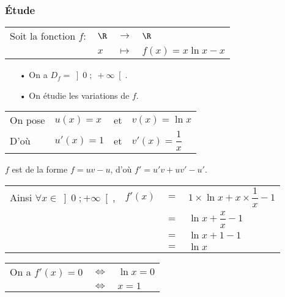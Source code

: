 \newpage

\vspace*{-.8cm}

\subsubsection{Étude }

\begin{tabular}{llll}
Soit la fonction  $f :$ & $\R$ & $\longrightarrow$ & $\R$ \\
& $x$ & $\longmapsto$ & $f\left(x\right) = x\ln x - x$ \\
\end{tabular}

\begin{itemize}
\item[•] On a $D_{f} = \left]0 \; ; \; +\infty\right[$. 

\item[•] On étudie les variations de $f$. \\
\end{itemize}

\begin{tabular}{llll}
On pose&  $u(x) = x$ & et & $v(x) = \ln x$ \\
D'où & $u'(x) = 1$ & et & $v'(x) = \dfrac{1}{x}$ \\
\end{tabular}

\vspace*{.3cm}

$f$ est de la forme $f = uv - u$, d'où $f' = u'v + uv' - u'$. \\

\begin{tabular}{llll}
Ainsi $\forall x \in \left]0 \; ; +\infty\right[$, & $f'(x)$ & $=$ & $1 \times \ln x + x \times \dfrac{1}{x} - 1$ \\
& & $=$ & $\ln x + \dfrac{x}{x} - 1$ \\
& & $=$ & $\ln x + 1 - 1$ \\
& & $=$ & $\ln x$ \\
\end{tabular}

\vspace*{.3cm}

\begin{tabular}{lll}
On a $f'(x) = 0$ & $\Longleftrightarrow$ & $\ln x = 0$ \\
& $\Longleftrightarrow$ & $x = 1$ \\
\end{tabular}

